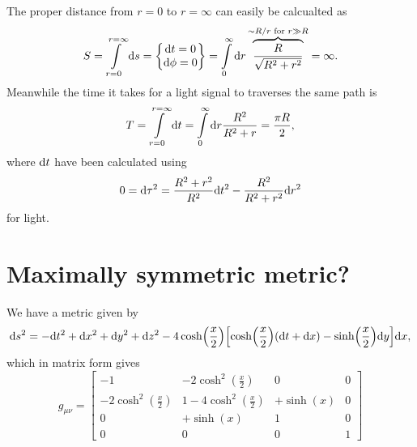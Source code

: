 \documentclass[11pt,a4paper, 
swedish, english %
]{article}
\begin{document}
The proper distance from $r=0$ to $r=\infty$ can easily be calcualted
as
\begin{equation}
S=\int_{r=0}^{r=\infty}\rd{s}=
\begin{Bmatrix}
\rd{t}=0\\
\rd{\phi}=0
\end{Bmatrix}
=\int_0^\infty\rd{r}
\overbrace{\frac{R}{\sqrt{R^2+r^2}}}^{\sim R/r\text{ for }r\gg R}
 =\infty.
\end{equation}
Meanwhile the time it takes for a light signal to traverses the same
path is
\begin{equation}
T=\int_{r=0}^{r=\infty}\rd{t}
=\int_0^\infty\rd{r}\frac{R^2}{R^2+r}
=\frac{\pi R}{2},
\end{equation}
where $\mathrm{d}{t}$ have been calculated using
\begin{equation}
0=\mathrm{d}{\tau^2}=\frac{R^2+r^2}{R^2}\mathrm{d}{t}^2
-\frac{R^2}{R^2+r^2}\mathrm{d}{r}^2
\end{equation}
for light.



\section{Maximally symmetric metric?}
We have a metric given by
\begin{equation}
\mathrm{d}{s}^2=-\mathrm{d}{t}^2+\mathrm{d}{x}^2+\mathrm{d}{y}^2+\mathrm{d}{z}^2
-4\cosh(\frac{x}{2})
\qty[\cosh(\frac{x}{2})(\mathrm{d}{t}+\mathrm{d}{x})-\sinh(\frac{x}{2})\mathrm{d}{y}]\mathrm{d}{x},
\end{equation}
which in matrix form gives
\begin{equation}
g_{\mu\nu}=
\begin{bmatrix}
-1 & -2\cosh^2(\frac{x}{2}) &0 &0\\
-2\cosh^2(\frac{x}{2}) &1-4\cosh^2(\frac{x}{2}) &+\sinh(x)&0\\
0&+\sinh(x)&1&0\\
0&0&0&1
\end{bmatrix}
\end{equation}












\end{document}
